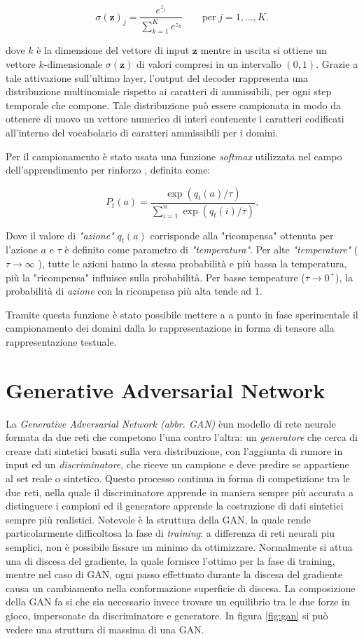 \[\sigma(\mathbf{z})_j = \frac{e^{z_j}}{\sum_{k=1}^K e^{z_k}}\qquad  \text{per}\; j=1,\ldots,K. \] 

dove $k$ è la dimensione del vettore di input $\mathbf{z}$ mentre in uscita si ottiene un vettore $k$-dimensionale $\sigma(\mathbf{z})$ di valori compresi in un intervallo $\left(0,1\right)$. Grazie a tale attivazione sull'ultimo layer, l'output del decoder rappresenta una distribuzione multinomiale rispetto ai caratteri di ammissibili, per ogni step temporale che compone. 
Tale distribuzione può essere campionata in modo da ottenere di nuovo un vettore numerico di interi contenente i caratteri codificati all'interno del vocabolario di caratteri ammissibili per i domini. 

Per il campionamento è stato usata una funzione \textit{softmax} utilizzata nel campo dell'apprendimento per rinforzo \cite{reinflearning}, definita come: 

\[P_t(a) = \frac{\exp(q_t(a)/\tau)}{\sum_{i=1}^n\exp(q_t(i)/\tau)} \text{,}\]

Dove il valore di\textit{ "azione"} $q_{t}(a)$ corrisponde alla "ricompensa" ottenuta per l'azione $a$ e $\tau$  è definito come parametro di \textit{"temperatura"}. Per alte \textit{"temperature"} ( $\tau \to \infty$ ), tutte le azioni hanno la stessa probabilità e più bassa la temperatura, più la "ricompensa" influisce sulla probabilità. Per basse tempeature ($\tau \to 0^{+}$), la probabilità di \textit{azione} con la ricompensa più alta tende ad 1. 

Tramite questa funzione è stato possibile mettere a a punto in fase sperimentale il campionamento dei domini dalla lo rappresentazione in forma di tensore alla rappresentazione testuale.

\section{Generative Adversarial Network}
\label{ganintro}
La \textit{Generative Adversarial Network (abbr. GAN)} èun modello di rete neurale formata da due reti che competono l'una contro l'altra: un \textit{generatore} che cerca di creare dati sintetici basati sulla vera distribuzione, con l'aggiunta di rumore in input ed un \textit{discriminatore}, che riceve un campione e deve predire se appartiene al set reale o sintetico. Questo processo continua in forma di competizione tra le due reti, nella quale il discriminatore apprende in maniera sempre più accurata a distinguere i campioni ed il generatore apprende la costruzione di dati sintetici sempre più realistici. Notevole è la struttura della GAN, la quale rende particolarmente difficoltosa la fase di \textit{training}: a differenza di reti neurali piu semplici, non è possibile fissare un minimo da ottimizzare. Normalmente si attua una di discesa del gradiente, la quale fornisce l'ottimo per la fase di training, mentre nel caso di GAN, ogni passo effettuato durante la discesa del gradiente causa un cambiamento nella conformazione superficie di discesa. La composizione della GAN fa si che sia necessario invece trovare un equilibrio tra le due forze in gioco, impersonate da discriminatore e generatore. In figura \ref{fig:gan} si può vedere una struttura di massima di una GAN.

